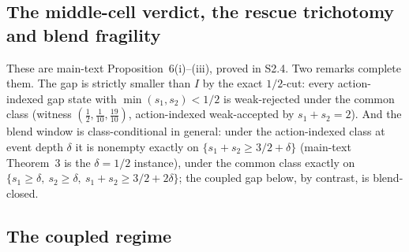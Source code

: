 \subsection{The middle-cell verdict, the rescue trichotomy and blend fragility}

These are main-text Proposition~6(i)--(iii), proved in S2.4. Two remarks complete them. The gap is strictly smaller than $I$ by the exact $1/2$-cut: every action-indexed gap state with $\min(s_1,s_2)<1/2$ is weak-rejected under the common class (witness $(\tfrac12,\tfrac1{10},\tfrac{19}{10})$, action-indexed weak-accepted by $s_1+s_2=2$). And the blend window is class-conditional in general: under the action-indexed class at event depth $\delta$ it is nonempty exactly on $\{s_1+s_2\ge3/2+\delta\}$ (main-text Theorem~3 is the $\delta=1/2$ instance), under the common class exactly on $\{s_1\ge\delta,\ s_2\ge\delta,\ s_1+s_2\ge3/2+2\delta\}$; the coupled gap below, by contrast, is blend-closed.

\subsection{The coupled regime}

